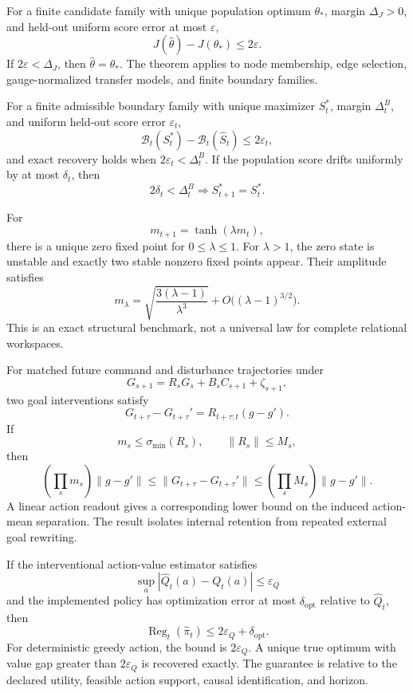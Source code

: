 
For a finite candidate family with unique population optimum \(\theta_*\),
margin \(\Delta_J>0\), and held-out uniform score error at most \(\varepsilon\),
\[
\boxed{
J(\widehat\theta)-J(\theta_*)\leq2\varepsilon.
}
\]
If \(2\varepsilon<\Delta_J\), then \(\widehat\theta=\theta_*\). The theorem
applies to node membership, edge selection, gauge-normalized transfer models,
and finite boundary families.


For a finite admissible boundary family with unique maximizer \(S_t^*\), margin
\(\Delta_t^B\), and uniform held-out score error \(\varepsilon_t\),
\[
\mathcal B_t(S_t^*)-
\mathcal B_t(\widehat S_t)
\leq2\varepsilon_t,
\]
and exact recovery holds when \(2\varepsilon_t<\Delta_t^B\). If the population
score drifts uniformly by at most \(\delta_t\), then
\[
2\delta_t<\Delta_t^B
\Longrightarrow
S_{t+1}^*=S_t^*.
\]


For
\[
m_{t+1}=\tanh(\lambda m_t),
\]
there is a unique zero fixed point for \(0\leq\lambda\leq1\). For
\(\lambda>1\), the zero state is unstable and exactly two stable nonzero fixed
points appear. Their amplitude satisfies
\[
\boxed{
m_\lambda
=
\sqrt{\frac{3(\lambda-1)}{\lambda^3}}
+
O\bigl((\lambda-1)^{3/2}\bigr).
}
\]
This is an exact structural benchmark, not a universal law for complete
relational workspaces.


For matched future command and disturbance trajectories under
\[
G_{s+1}=R_sG_s+B_sC_{s+1}+\zeta_{s+1},
\]
two goal interventions satisfy
\[
\boxed{
G_{t+\tau}-G_{t+\tau}'
=
R_{t+\tau:t}(g-g').
}
\]
If
\[
m_s\leq\sigma_{\min}(R_s),
\qquad
\|R_s\|\leq M_s,
\]
then
\[
\boxed{
\left(\prod_s m_s\right)\|g-g'\|
\leq
\|G_{t+\tau}-G_{t+\tau}'\|
\leq
\left(\prod_s M_s\right)\|g-g'\|.
}
\]
A linear action readout gives a corresponding lower bound on the induced
action-mean separation. The result isolates internal retention from repeated
external goal rewriting.


If the interventional action-value estimator satisfies
\[
\sup_a|\widehat Q_t(a)-Q_t(a)|\leq\varepsilon_Q
\]
and the implemented policy has optimization error at most
\(\delta_{\mathrm{opt}}\) relative to \(\widehat Q_t\), then
\[
\boxed{
\operatorname{Reg}_t(\widehat\pi_t)
\leq
2\varepsilon_Q+\delta_{\mathrm{opt}}.
}
\]
For deterministic greedy action, the bound is \(2\varepsilon_Q\). A unique
true optimum with value gap greater than \(2\varepsilon_Q\) is recovered
exactly. The guarantee is relative to the declared utility, feasible action
support, causal identification, and horizon.


